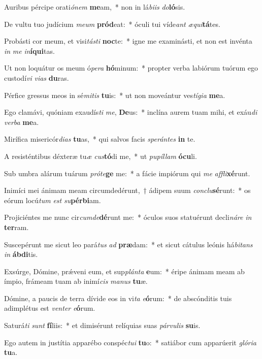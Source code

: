 \item Auribus pércipe orati\textit{ó}\textit{nem} \textbf{me}am,~* non in lá\textit{bi}\textit{is} \textit{do}\textbf{ló}sis.
\item De vultu tuo judícium \textit{me}\textit{um} \textbf{pród}eat:~* óculi tui víde\textit{ant} \textit{æ}\textit{qui}\textbf{tá}tes.
\item Probásti cor meum, et visi\textit{tás}\textit{ti} \textbf{noc}te:~* igne me examinásti, et non est invénta \textit{in} \textit{me} \textit{in}\textbf{í}\textbf{qui}tas.
\item Ut non loquátur os meum ó\textit{pe}\textit{ra} \textbf{hó}minum:~* propter verba labiórum tuórum ego custodí\textit{vi} \textit{vi}\textit{as} \textbf{du}ras.
\item Pérfice gressus meos in sé\textit{mi}\textit{tis} \textbf{tu}is:~* ut non moveántur ves\textit{tí}\textit{gi}\textit{a} \textbf{me}a.
\item Ego clamávi, quóniam exaudís\textit{ti} \textit{me}, \textbf{De}us:~* inclína aurem tuam mihi, et exáu\textit{di} \textit{ver}\textit{ba} \textbf{me}a.
\item Mirífica misericór\textit{di}\textit{as} \textbf{tu}as,~* qui salvos facis \textit{spe}\textit{rán}\textit{tes} \textbf{in} te.
\item A resisténtibus déxteræ tu\textit{æ} \textit{cus}\textbf{tó}di me,~* ut \textit{pu}\textit{píl}\textit{lam} \textbf{ó}\textbf{cu}li.
\item Sub umbra alárum tuárum \textit{pró}\textit{te}\textbf{ge} me:~* a fácie impiórum qui \textit{me} \textit{af}\textit{fli}\textbf{xé}runt.
\item Inimíci mei ánimam meam circumdedérunt,~† ádipem suum \textit{con}\textit{clu}\textbf{sé}runt:~* os eórum locú\textit{tum} \textit{est} \textit{su}\textbf{pér}\textbf{bi}am.
\item Projiciéntes me nunc cir\textit{cum}\textit{de}\textbf{dé}runt me:~* óculos suos statuérunt decli\textit{ná}\textit{re} \textit{in} \textbf{ter}ram.
\item Suscepérunt me sicut leo pará\textit{tus} \textit{ad} \textbf{præ}dam:~* et sicut cátulus leónis há\textit{bi}\textit{tans} \textit{in} \textbf{áb}\textbf{di}tis.
\item Exsúrge, Dómine, prǽveni eum, et sup\textit{plán}\textit{ta} \textbf{e}um:~* éripe ánimam meam ab ímpio, frámeam tuam ab inimí\textit{cis} \textit{ma}\textit{nus} \textbf{tu}æ.
\item Dómine, a paucis de terra dívide eos in vi\textit{ta} \textit{e}\textbf{ó}rum:~* de abscónditis tuis adimplétus est \textit{ven}\textit{ter} \textit{e}\textbf{ó}rum.
\item Saturá\textit{ti} \textit{sunt} \textbf{fí}liis:~* et dimisérunt relíquias suas \textit{pár}\textit{vu}\textit{lis} \textbf{su}is.
\item Ego autem in justítia apparébo conspéc\textit{tu}\textit{i} \textbf{tu}o:~* satiábor cum apparúerit \textit{gló}\textit{ri}\textit{a} \textbf{tu}a.
